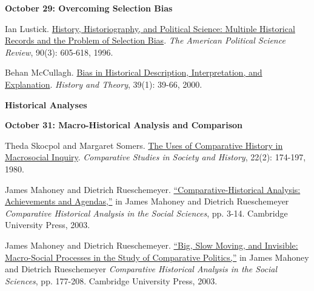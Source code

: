 \documentclass[letterpaper]{article}
\renewenvironment{itemize}{
  \begin{list}{}{
    \setlength{\leftmargin}{1.5em}
  }
}{
  \end{list}
}
\begin{document}
\begin{enumerate}
		\begin{itemize}
		\item {\bf October 29: Overcoming Selection Bias}
			\begin{itemize}
				\item[$\bullet$] Ian Lustick. \href{http://www.jstor.org/stable/2082612}{History, Historiography, and Political Science: Multiple Historical Records and the Problem of Selection Bias}. \emph{The American Political Science Review}, 90(3): 605-618, 1996.
				\item[$\bullet$] Behan McCullagh. \href{http://www.jstor.org/stable/2677997}{Bias in Historical Description, Interpretation, and Explanation}. \emph{History and Theory}, 39(1): 39-66, 2000.
			\end{itemize}
		\end{itemize}


\item {\bf Historical Analyses}
		
		\begin{itemize}
		\item {\bf October 31: Macro-Historical Analysis and Comparison}
			\begin{itemize}
				\item[$\bullet$] Theda Skocpol and Margaret Somers. \href{http://www.jstor.org/stable/178404}{The Uses of Comparative History in Macrosocial Inquiry}. \emph{Comparative Studies in Society and History}, 22(2): 174-197, 1980.
				\item[$\bullet$] James Mahoney and Dietrich Rueschemeyer. \href{https://content.schweitzer-online.de/static/catalog_manager/live/media_files/representation/zd_std_orig__zd_schw_orig/002/352/762/9780521816106_content_pdf_1.pdf}{``Comparative-Historical Analysis: Achievements and Agendas,''} in James Mahoney and Dietrich Rueschemeyer \emph{Comparative Historical Analysis in the Social Sciences}, pp. 3-14. Cambridge University Press, 2003. 
				\item[$\bullet$] James Mahoney and Dietrich Rueschemeyer. \href{https://www.google.com/url?sa=t&rct=j&q=&esrc=s&source=web&cd=2&cad=rja&uact=8&ved=0ahUKEwjjlebb7sTbAhXyna0KHWH9AGAQFggrMAE&url=https%3A%2F%2Fcanvas.coloradocollege.edu%2Ffiles%2F5333%2Fdownload%3Fdownload_frd%3D1%26verifier%3DGzimNk8tWeD5HoK4czIDYdyyDjqXAaGUzFWhFDLD&usg=AOvVaw0XARLEGWJXOsc2uYGyFbPO}{``Big, Slow Moving, and Invisible: Macro-Social Processes in the Study of Comparative Politics,''} in James Mahoney and Dietrich Rueschemeyer \emph{Comparative Historical Analysis in the Social Sciences}, pp. 177-208. Cambridge University Press, 2003.


\end{itemize}
\end{itemize}
\end{enumerate}
\end{document}

